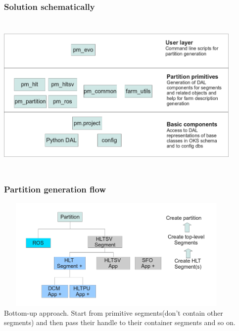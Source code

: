 \documentclass{beamer}
\begin{document}
\begin{frame}
 \frametitle{Solution schematically}
 \includegraphics[height=8cm,width=12cm]{images/partition_maker_layers.png}
 
\end{frame}

\begin{frame}
\frametitle{Partition generation flow}
\includegraphics[height=5.5cm,width=12cm]{images/generation_flow.png} \\
Bottom-up approach. Start from primitive segments(don't contain other segments) and then pass their handle to their container segments and so on.
\end{frame}
\end{document}
